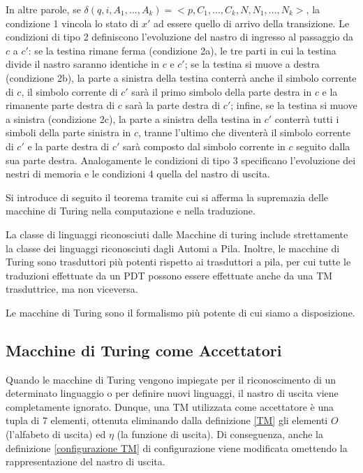   In altre parole, se \(\delta(q,i,A_1,...,A_k)=<p,C_1,...,C_k,N,N_1,...,N_k>\), la condizione 1 vincola lo stato di \(x'\) ad essere quello di arrivo della transizione. Le condizioni di tipo 2 definiscono l'evoluzione del nastro di ingresso al passaggio da \(c\) a \(c'\): se la testina rimane ferma (condizione 2a), le tre parti in cui la testina divide il nastro saranno identiche in \(c\) e \(c'\); se la testina si muove a destra (condizione 2b), la parte a sinistra della testina conterrà anche il simbolo corrente di \(c\), il simbolo corrente di \(c'\) sarà il primo simbolo della parte destra in \(c\) e la rimanente parte destra di \(c\) sarà la parte destra di \(c'\); infine, se la testina si muove a sinistra (condizione 2c), la parte a sinistra della testina in \(c'\) conterrà tutti i simboli della parte sinistra in \(c\), tranne l'ultimo che diventerà il simbolo corrente di \(c'\) e la parte destra di \(c'\) sarà composto dal simbolo corrente in \(c\) seguito dalla sua parte destra. Analogamente le condizioni di tipo 3 specificano l'evoluzione dei nestri di memoria e le condizioni 4 quella del nastro di uscita.

  Si introduce di seguito il teorema tramite cui si afferma la supremazia delle macchine di Turing nella computazione e nella traduzione.

  \begin{theorem}
    La classe di linguaggi riconosciuti dalle Macchine di turing include strettamente la classe dei linguaggi riconosciuti dagli Automi a Pila.
    Inoltre, le macchine di Turing sono trasduttori più potenti rispetto ai trasduttori a pila, per cui tutte le traduzioni effettuate da un PDT possono essere effettuate anche da una TM trasduttrice, ma non viceversa.
  \end{theorem}
  
  \noindent
  Le macchine di Turing sono il formalismo più potente di cui siamo a disposizione.

  \subsection{Macchine di Turing come Accettatori}
  Quando le macchine di Turing vengono impiegate per il riconoscimento di un determinato linguaggio o per definire nuovi linguaggi, il nastro di uscita viene completamente ignorato. Dunque, una TM utilizzata come accettatore è una tupla di 7 elementi, ottenuta eliminando dalla definizione \ref{TM} gli elementi \(O\) (l'alfabeto di uscita) ed \(\eta\) (la funzione di uscita). Di conseguenza, anche la definizione \ref{configurazione TM} di configurazione viene modificata omettendo la rappresentazione del nastro di uscita.

